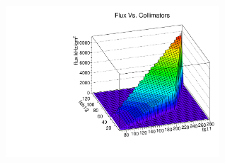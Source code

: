 \documentclass[9pt]{beamer}
\begin{document}
\begin{frame}
	\begin{center}
		\includegraphics[angle=270, width=8cm]{FluxVsCollimators}
	\end{center}
\end{frame}
\end{document}
